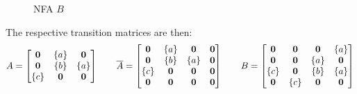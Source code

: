 \documentclass[12pt]{article}
\begin{document}
\begin{example}
\begin{figure}[h!]
\begin{minipage}{0.45\textwidth}
\begin{tikzpicture}
  \end{tikzpicture}
  \caption{NFA \(B\)}
  \end{minipage}
  \end{figure}
  The respective transition matrices are then:
  \begin{align*}
    A =
      \begin{bmatrix}
        \zero & \braces{a} & \zero \\
        \zero & \braces{b} & \braces{a} \\
        \braces{c} & \zero & \zero
      \end{bmatrix}
    \qquad
    \overline{A} =
      \begin{bmatrix}
        \zero & \braces{a} & \zero & \zero \\
        \zero & \braces{b} & \braces{a} & \zero \\
        \braces{c} & \zero & \zero & \zero \\
        \zero & \zero & \zero & \zero
      \end{bmatrix}
    \qquad
    B =
      \begin{bmatrix}
        \zero & \zero & \zero & \braces{a} \\
        \zero & \zero & \braces{a} & \zero \\
        \braces{c} & \zero & \braces{b} & \braces{a} \\
        \zero & \braces{c} & \zero & \zero
      \end{bmatrix}
  \end{align*}


\end{example}
\end{document}
